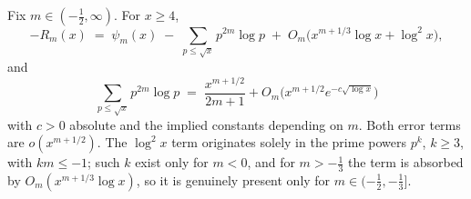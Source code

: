 
\begin{lemma}\label{lem:squares}
Fix $m\in(-\tfrac12,\infty)$. For $x\ge4$,
\[
-R_m(x)\;=\;\psi_m(x)\;-\;\sum_{p\le\sqrt x}p^{2m}\log p
\;+\;O_m\!\bigl(x^{m+1/3}\log x+\log^2x\bigr),
\]
and
\[
\sum_{p\le\sqrt x}p^{2m}\log p\;=\;\frac{x^{m+1/2}}{2m+1}
+O_m\!\bigl(x^{m+1/2}e^{-c\sqrt{\log x}}\bigr)
\]
with $c>0$ absolute and the implied constants depending on $m$. Both
error terms are $o(x^{m+1/2})$. The $\log^2x$ term originates solely in
the prime powers $p^k$, $k\ge3$, with $km\le-1$; such $k$ exist only
for $m<0$, and for $m>-\tfrac13$ the term is absorbed by
$O_m(x^{m+1/3}\log x)$, so it is genuinely present only for
$m\in(-\tfrac12,-\tfrac13]$.
\end{lemma}


